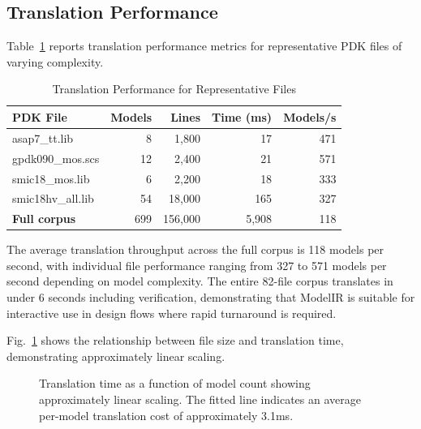 \documentclass[conference]{IEEEtran}
\begin{document}
\subsection{Translation Performance}

Table~\ref{tab:performance} reports translation performance metrics for representative PDK files of varying complexity.

\begin{table}[htbp]
\caption{Translation Performance for Representative Files}
\label{tab:performance}
\centering
\begin{tabular}{lrrrr}
\toprule
\textbf{PDK File} & \textbf{Models} & \textbf{Lines} & \textbf{Time (ms)} & \textbf{Models/s} \\
\midrule
asap7\_tt.lib & 8 & 1,800 & 17 & 471 \\
gpdk090\_mos.scs & 12 & 2,400 & 21 & 571 \\
smic18\_mos.lib & 6 & 2,200 & 18 & 333 \\
smic18hv\_all.lib & 54 & 18,000 & 165 & 327 \\
\midrule
\textbf{Full corpus} & 699 & 156,000 & 5,908 & 118 \\
\bottomrule
\end{tabular}
\end{table}

The average translation throughput across the full corpus is 118 models per second, with individual file performance ranging from 327 to 571 models per second depending on model complexity. The entire 82-file corpus translates in under 6 seconds including verification, demonstrating that ModelIR is suitable for interactive use in design flows where rapid turnaround is required.

Fig.~\ref{fig:perf_scaling} shows the relationship between file size and translation time, demonstrating approximately linear scaling.

\begin{figure}[htbp]
\centering
{}
\caption{Translation time as a function of model count showing approximately linear scaling. The fitted line indicates an average per-model translation cost of approximately 3.1ms.}
\label{fig:perf_scaling}
\end{figure}
\end{document}
